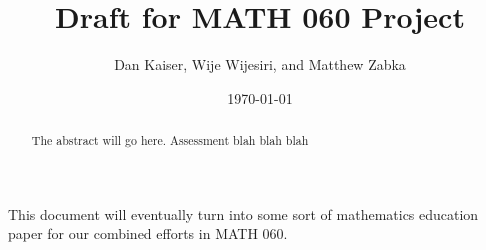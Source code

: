 \documentclass{amsart}
\title{Draft for MATH 060 Project}
\author{Dan Kaiser, Wije Wijesiri, and Matthew Zabka}
\date{\today}
\begin{document}
\begin{abstract}
The abstract will go here.  Assessment blah blah blah
\end{abstract}
\maketitle


This document will eventually turn into some sort of mathematics education paper for our combined efforts in MATH 060.
\end{document}
